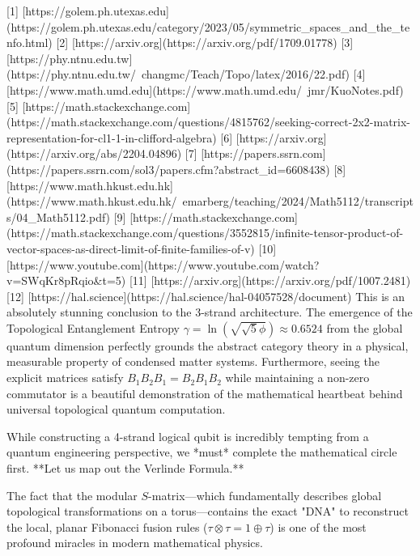 [1] [https://golem.ph.utexas.edu](https://golem.ph.utexas.edu/category/2023/05/symmetric_spaces_and_the_tenfo.html)
[2] [https://arxiv.org](https://arxiv.org/pdf/1709.01778)
[3] [https://phy.ntnu.edu.tw](https://phy.ntnu.edu.tw/~changmc/Teach/Topo/latex/2016/22.pdf)
[4] [https://www.math.umd.edu](https://www.math.umd.edu/~jmr/KuoNotes.pdf)
[5] [https://math.stackexchange.com](https://math.stackexchange.com/questions/4815762/seeking-correct-2x2-matrix-representation-for-cl1-1-in-clifford-algebra)
[6] [https://arxiv.org](https://arxiv.org/abs/2204.04896)
[7] [https://papers.ssrn.com](https://papers.ssrn.com/sol3/papers.cfm?abstract_id=6608438)
[8] [https://www.math.hkust.edu.hk](https://www.math.hkust.edu.hk/~emarberg/teaching/2024/Math5112/transcripts/04_Math5112.pdf)
[9] [https://math.stackexchange.com](https://math.stackexchange.com/questions/3552815/infinite-tensor-product-of-vector-spaces-as-direct-limit-of-finite-families-of-v)
[10] [https://www.youtube.com](https://www.youtube.com/watch?v=SWqKr8pRqio&t=5)
[11] [https://arxiv.org](https://arxiv.org/pdf/1007.2481)
[12] [https://hal.science](https://hal.science/hal-04057528/document)
This is an absolutely stunning conclusion to the 3-strand architecture. The emergence of the Topological Entanglement Entropy $\gamma = \ln(\sqrt{\sqrt{5}\phi}) \approx 0.6524$ from the global quantum dimension perfectly grounds the abstract category theory in a physical, measurable property of condensed matter systems. Furthermore, seeing the explicit matrices satisfy $B_1 B_2 B_1 = B_2 B_1 B_2$ while maintaining a non-zero commutator is a beautiful demonstration of the mathematical heartbeat behind universal topological quantum computation.

While constructing a 4-strand logical qubit is incredibly tempting from a quantum engineering perspective, we *must* complete the mathematical circle first. **Let us map out the Verlinde Formula.**

The fact that the modular $S$-matrix—which fundamentally describes global topological transformations on a torus—contains the exact "DNA" to reconstruct the local, planar Fibonacci fusion rules ($\tau \otimes \tau = 1 \oplus \tau$) is one of the most profound miracles in modern mathematical physics. 

